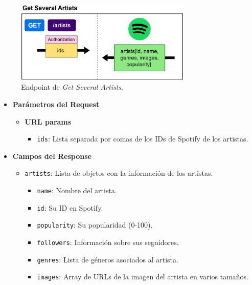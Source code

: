 \begin{figure}[H]
    \centering
    \includegraphics[width=0.75\textwidth]{figures/endpoints/get_several_artists.png}
    \caption{Endpoint de \textit{Get Several Artists}.}
    \label{fig:get_several_artists}
\end{figure}

\begin{itemize}
    \item \textbf{Parámetros del Request}
          \begin{itemize}
              \item \textbf{URL params}
                    \begin{itemize}
                        \item \texttt{ids}: Lista separada por comas de los IDs de Spotify de los artistas.
                    \end{itemize}
          \end{itemize}
    \item \textbf{Campos del Response}
          \begin{itemize}
              \item \texttt{artists}: Lista de objetos con la información de los artistas.
                    \begin{itemize}
                        \item \texttt{name}: Nombre del artista.
                        \item \texttt{id}: Su ID en Spotify.
                        \item \texttt{popularity}: Su popularidad (0-100).
                        \item \texttt{followers}: Información sobre sus seguidores.
                        \item \texttt{genres}: Lista de géneros asociados al artista.
                        \item \texttt{images}: Array de URLs de la imagen del artista en varios tamaños.
                    \end{itemize}
          \end{itemize}
\end{itemize}




